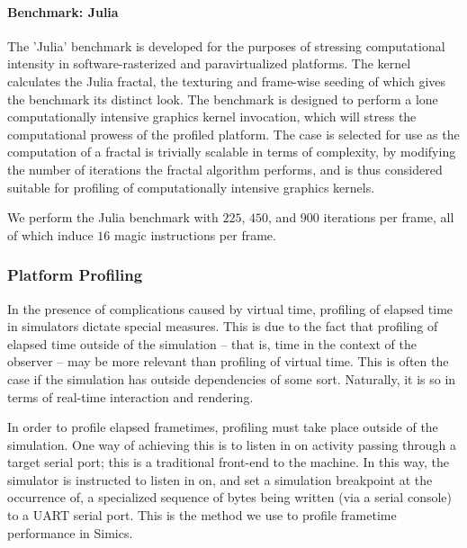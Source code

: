 \paragraph{Benchmark: Julia}
\label{par:experimentalmethodology_benchmarking_benchmarkjulia}
The 'Julia' benchmark is developed for the purposes of stressing computational intensity in software-rasterized and paravirtualized platforms.
The kernel calculates the Julia fractal, the texturing and frame-wise seeding of which gives the benchmark its distinct look.
The benchmark is designed to perform a lone computationally intensive graphics kernel invocation, which will stress the computational prowess of the profiled platform.
The case is selected for use as the computation of a fractal is trivially scalable in terms of complexity, by modifying the number of iterations the fractal algorithm performs, and is thus considered suitable for profiling of computationally intensive graphics kernels.

We perform the Julia benchmark with $225$, $450$, and $900$ iterations per frame, all of which induce $16$ magic instructions per frame.

\subsubsection{Platform Profiling}
\label{sec:platformprofiling}
In the presence of complications caused by virtual time, profiling of elapsed time in simulators dictate special measures.
This is due to the fact that profiling of elapsed time outside of the simulation -- that is, time in the context of the observer -- may be more relevant than profiling of virtual time.
This is often the case if the simulation has outside dependencies of some sort.
Naturally, it is so in terms of real-time interaction and rendering.

In order to profile elapsed frametimes, profiling must take place outside of the simulation.
One way of achieving this is to listen in on activity passing through a target serial port; this is a traditional front-end to the machine.
In this way, the simulator is instructed to listen in on, and set a simulation breakpoint at the occurrence of, a specialized sequence of bytes being written (via a serial console) to a UART serial port.
This is the method we use to profile frametime performance in Simics.

